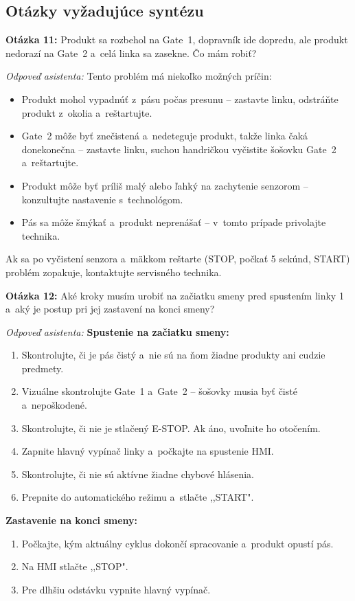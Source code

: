 \subsection*{Otázky vyžadujúce syntézu}

\textbf{Otázka 11:} Produkt sa rozbehol na Gate~1, dopravník ide dopredu,
ale produkt nedorazí na Gate~2 a~celá linka sa zasekne. Čo mám robiť?

\textit{Odpoveď asistenta:}
Tento problém má niekoľko možných príčin:
\begin{itemize}
      \item Produkt mohol vypadnúť z~pásu počas presunu -- zastavte linku,
            odstráňte produkt z~okolia a~reštartujte.
      \item Gate~2 môže byť znečistená a~nedeteguje produkt, takže linka
            čaká donekonečna -- zastavte linku, suchou handričkou vyčistite
            šošovku Gate~2 a~reštartujte.
      \item Produkt môže byť príliš malý alebo ľahký na zachytenie senzorom
            -- konzultujte nastavenie s~technológom.
      \item Pás sa môže šmýkať a~produkt neprenášať -- v~tomto prípade
            privolajte technika.
\end{itemize}
Ak sa po vyčistení senzora a~mäkkom reštarte (STOP, počkať 5 sekúnd, START)
problém zopakuje, kontaktujte servisného technika.

\bigskip
\noindent\textbf{Otázka 12:} Aké kroky musím urobiť na začiatku smeny pred spustením
linky 1 a~aký je postup pri jej zastavení na konci smeny?

\textit{Odpoveď asistenta:}
\textbf{Spustenie na začiatku smeny:}
\begin{enumerate}
      \item Skontrolujte, či je pás čistý a~nie sú na ňom žiadne produkty
            ani cudzie predmety.
      \item Vizuálne skontrolujte Gate~1 a~Gate~2 -- šošovky musia byť čisté
            a~nepoškodené.
      \item Skontrolujte, či nie je stlačený E-STOP. Ak áno, uvoľnite ho otočením.
      \item Zapnite hlavný vypínač linky a~počkajte na spustenie HMI.
      \item Skontrolujte, či nie sú aktívne žiadne chybové hlásenia.
      \item Prepnite do automatického režimu a~stlačte ,,START".
\end{enumerate}
\textbf{Zastavenie na konci smeny:}
\begin{enumerate}
      \item Počkajte, kým aktuálny cyklus dokončí spracovanie a~produkt
            opustí pás.
      \item Na HMI stlačte ,,STOP".
      \item Pre dlhšiu odstávku vypnite hlavný vypínač.
\end{enumerate}

